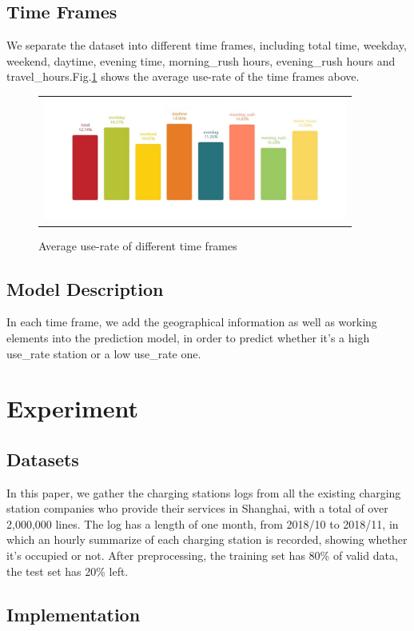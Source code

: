 \documentclass[conference]{IEEEtran}
\begin{document}
\subsection{Time Frames}
We separate the dataset into different time frames, including total time, weekday, weekend, daytime, evening time, morning\_rush hours, evening\_rush hours and travel\_hours.Fig.\ref{fig2} shows the average use-rate of the time frames above.
\begin{figure}[htbp]
	\begin{tabular}{c}
		\includegraphics[width=100mm]{timeframes.pdf}
	\end{tabular}
	\centering
	\caption{Average use-rate of different time frames}
	\label{fig2}
\end{figure}

\subsection{Model Description}
In each time frame, we add the geographical information as well as working elements into the prediction model, in order to predict whether it’s a high use\_rate station or a low use\_rate one.
\section{Experiment}

\subsection{Datasets}
In this paper, we gather the charging stations logs from all the existing charging station companies who provide their services in Shanghai, with a total of over 2,000,000 lines. The log has a length of one month, from 2018/10 to 2018/11, in which an hourly summarize of each charging station is recorded, showing whether it's occupied or not. After preprocessing, the training set has 80\% of valid data, the test set has 20\% left.

\subsection{Implementation}
\end{document}
